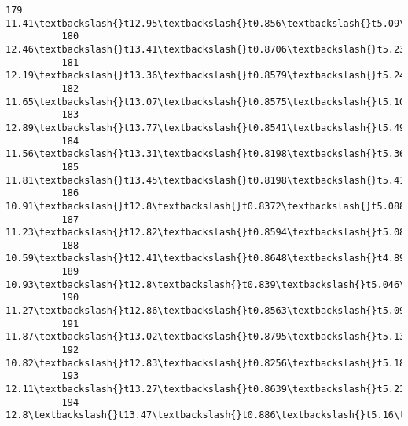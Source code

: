 \documentclass[11pt]{article}
\begin{document}
\begin{Verbatim}[commandchars=\\\{\}]
          179  11.41\textbackslash{}t12.95\textbackslash{}t0.856\textbackslash{}t5.09\textbackslash{}t2.775\textbackslash{}t4.957\textbackslash{}t4.825\textbackslash{}t3
          180  12.46\textbackslash{}t13.41\textbackslash{}t0.8706\textbackslash{}t5.236\textbackslash{}t3.017\textbackslash{}t4.987\textbackslash{}t5.1{\ldots}
          181  12.19\textbackslash{}t13.36\textbackslash{}t0.8579\textbackslash{}t5.24\textbackslash{}t2.909\textbackslash{}t4.857\textbackslash{}t5.15{\ldots}
          182  11.65\textbackslash{}t13.07\textbackslash{}t0.8575\textbackslash{}t5.108\textbackslash{}t2.85\textbackslash{}t5.209\textbackslash{}t5.13{\ldots}
          183  12.89\textbackslash{}t13.77\textbackslash{}t0.8541\textbackslash{}t5.495\textbackslash{}t3.026\textbackslash{}t6.185\textbackslash{}t5.3{\ldots}
          184  11.56\textbackslash{}t13.31\textbackslash{}t0.8198\textbackslash{}t5.363\textbackslash{}t2.683\textbackslash{}t4.062\textbackslash{}t5.1{\ldots}
          185  11.81\textbackslash{}t13.45\textbackslash{}t0.8198\textbackslash{}t5.413\textbackslash{}t2.716\textbackslash{}t4.898\textbackslash{}t5.3{\ldots}
          186  10.91\textbackslash{}t12.8\textbackslash{}t0.8372\textbackslash{}t5.088\textbackslash{}t2.675\textbackslash{}t4.179\textbackslash{}t4.95{\ldots}
          187  11.23\textbackslash{}t12.82\textbackslash{}t0.8594\textbackslash{}t5.089\textbackslash{}t2.821\textbackslash{}t7.524\textbackslash{}t4.9{\ldots}
          188  10.59\textbackslash{}t12.41\textbackslash{}t0.8648\textbackslash{}t4.899\textbackslash{}t2.787\textbackslash{}t4.975\textbackslash{}t4.7{\ldots}
          189  10.93\textbackslash{}t12.8\textbackslash{}t0.839\textbackslash{}t5.046\textbackslash{}t2.717\textbackslash{}t5.398\textbackslash{}t5.045\textbackslash{}t3
          190  11.27\textbackslash{}t12.86\textbackslash{}t0.8563\textbackslash{}t5.091\textbackslash{}t2.804\textbackslash{}t3.985\textbackslash{}t5.0{\ldots}
          191  11.87\textbackslash{}t13.02\textbackslash{}t0.8795\textbackslash{}t5.132\textbackslash{}t2.953\textbackslash{}t3.597\textbackslash{}t5.1{\ldots}
          192  10.82\textbackslash{}t12.83\textbackslash{}t0.8256\textbackslash{}t5.18\textbackslash{}t2.63\textbackslash{}t4.853\textbackslash{}t5.089\textbackslash{}t3
          193  12.11\textbackslash{}t13.27\textbackslash{}t0.8639\textbackslash{}t5.236\textbackslash{}t2.975\textbackslash{}t4.132\textbackslash{}t5.0{\ldots}
          194   12.8\textbackslash{}t13.47\textbackslash{}t0.886\textbackslash{}t5.16\textbackslash{}t3.126\textbackslash{}t4.873\textbackslash{}t4.914\textbackslash{}t3

\end{Verbatim}
\end{document}
